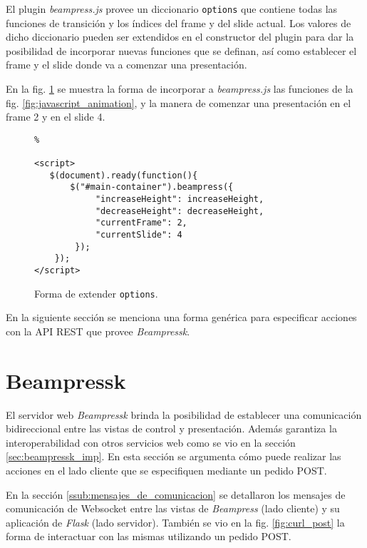 		El plugin \textit{beampress.js} provee un diccionario \texttt{options} que contiene todas las funciones de transición y los índices del frame y del slide actual. Los valores de dicho diccionario pueden ser extendidos en el constructor del plugin para dar la posibilidad de incorporar nuevas funciones que se definan, así como establecer el frame y el slide donde va a comenzar una presentación.

		En la fig. \ref{fig:extending_beampress} se muestra la forma de incorporar a \textit{beampress.js} las funciones de la fig. \ref{fig:javascript_animation}, y la manera de comenzar una presentación en el frame 2 y en el slide 4. 

		\begin{figure}[htb]%
			\begin{lstlisting}%

<script>
   $(document).ready(function(){ 
       $("#main-container").beampress({
       		"increaseHeight": increaseHeight,
       		"decreaseHeight": decreaseHeight,
       		"currentFrame": 2,
       		"currentSlide": 4
       	});
    });
</script>

			\end{lstlisting}
		\caption{Forma de extender \texttt{options}.} 
		\label{fig:extending_beampress}
		\end{figure}

		En la siguiente sección se menciona una forma genérica para especificar acciones con la API REST que provee \textit{Beampressk}. 

	\section{Beampressk} %
	\label{sec:beampressk_extended}
		El servidor web \textit{Beampressk} brinda la posibilidad de establecer una comunicación bidireccional entre las vistas de control y presentación. Además garantiza la interoperabilidad con otros servicios web como se vio en la sección \ref{sec:beampressk_imp}. En esta sección se argumenta cómo puede realizar las acciones en el lado cliente que se especifiquen mediante un pedido POST.


		En la sección \ref{ssub:mensajes_de_comunicacion} se detallaron los mensajes de comunicación de Websocket entre las vistas de \textit{Beampress} (lado cliente) y su aplicación de \textit{Flask} (lado servidor). También se vio en la fig. \ref{fig:curl_post} la forma de interactuar con las mismas utilizando un pedido POST. 

